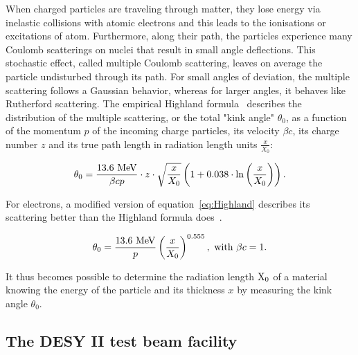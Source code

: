     When charged particles are traveling through matter, they lose energy via inelastic collisions with atomic electrons and this leads to the ionisations or excitations of atom.
    Furthermore, along their path, the particles experience many Coulomb scatterings on nuclei that result in small angle deflections.
    This stochastic effect, called multiple Coulomb scattering, leaves on average the particle undisturbed through its path. 
    For small angles of deviation, the multiple scattering follows a Gaussian behavior, whereas for larger angles, it behaves like Rutherford scattering.
    The empirical Highland formula~\cite{Highland:1975pq} describes the distribution of the multiple scattering, or the total "kink angle" $\theta_0$, as a function of the momentum $p$ of the incoming charge particles, its velocity $\beta c$, its charge number $z$ and its true path length in radiation length units $\frac{x}{X_{0}}$:

    \begin{equation}
      \theta_{0} = \frac{13.6~\rm{MeV}}{\beta c p}\cdot z \cdot \sqrt{\frac{x}{X_{0}}}\left(1 + 0.038 \cdot \ln{\left(\frac{x}{X_{0}}\right)}\right).
      \label{eq:Highland}
    \end{equation}

    For electrons, a modified version of equation~\ref{eq:Highland} describes its scattering better than the Highland formula does~\cite{GEANT4}.

    \begin{equation}
      \theta_{0} = \frac{13.6~\rm{MeV}}{p}\left(\frac{x}{X_{0}}\right)^{0.555},~\text{with $\beta c = 1$.}
      \label{eq:theta0}
    \end{equation}


    It thus becomes possible to determine the radiation length $\rm{X_0}$ of a material knowing the energy of the particle and its thickness $x$ by measuring the kink angle $\theta_0$.

    \subsection{The DESY II test beam facility}

